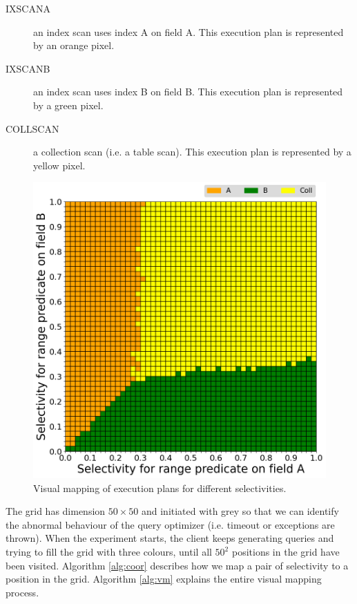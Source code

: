 \begin{description}
     \item [IXSCAN\textunderscore A] an index scan uses 
     index A on field A. This
     execution plan is represented by an orange pixel. 
    \item [IXSCAN\textunderscore B] an index scan uses index B  on field B. This execution
    plan  is represented by a green pixel. 
    \item [COLLSCAN] a collection scan (i.e. a table scan). 
    This execution plan is represented by a yellow pixel.
\end{description}

\begin{figure}[hb]
  \centering
  \includegraphics[width=0.7\linewidth]{images/results-without-covering-index/mongo-original/comprehensive_practical_winner.png}
  \vspace*{-0.5\baselineskip}
  \caption{Visual mapping of execution plans for different selectivities.}
  \label{fig:grid-sample}
\end{figure}

The grid has dimension $50 \times 50$ and initiated with 
grey so that we can identify the abnormal behaviour of the 
query optimizer (i.e. timeout or exceptions are thrown).  
When the experiment starts, the client keeps generating 
queries and trying to fill the grid with three colours, 
until all $50^2$ positions in the grid have been visited. 
Algorithm \ref{alg:coor} describes how we map a pair of 
selectivity to a position in the grid. Algorithm \ref{alg:vm}
explains the entire visual mapping process.

